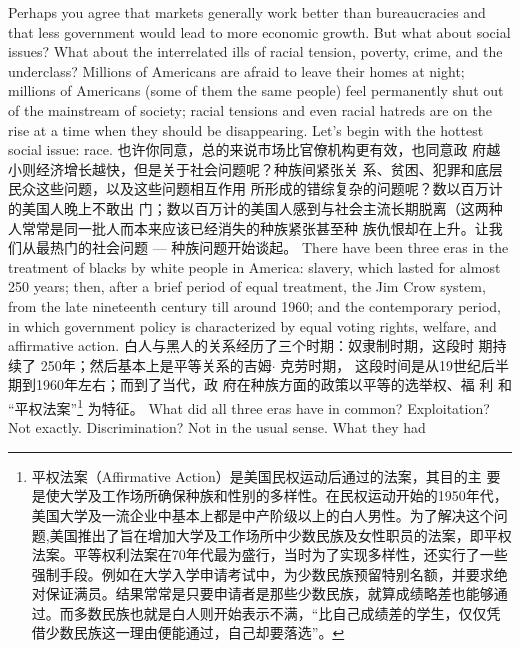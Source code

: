 \begin{paracol}{2}
Perhaps you agree that markets generally work better than bureaucracies and that less government would lead to more economic growth. But what about social issues? What about the
interrelated ills of racial tension, poverty, crime, and the underclass? Millions of Americans are afraid to leave their homes at
night; millions of Americans (some of them the same people)
feel permanently shut out of the mainstream of society; racial
tensions and even racial hatreds are on the rise at a time when
they should be disappearing. Let's begin with the hottest social
issue: race.
\switchcolumn
也许你同意，总的来说市场比官僚机构更有效，也同意政
府越小则经济增长越快，但是关于社会问题呢？种族间紧张关
系、贫困、犯罪和底层民众这些问题，以及这些问题相互作用
所形成的错综复杂的问题呢？数以百万计的美国人晚上不敢出
门；数以百万计的美国人感到与社会主流长期脱离（这两种
人常常是同一批人而本来应该已经消失的种族紧张甚至种
族仇恨却在上升。让我们从最热门的社会问题 --- 种族问题开始谈起。
\switchcolumn*
There have been three eras in the treatment of blacks by
white people in America: slavery, which lasted for almost 250
years; then, after a brief period of equal treatment, the Jim
Crow system, from the late nineteenth century till around
1960; and the contemporary period, in which government policy is characterized by equal voting rights, welfare, and affirmative action.
\switchcolumn
白人与黑人的关系经历了三个时期：奴隶制时期，这段时
期持续了 250年；然后基本上是平等关系的吉姆$\cdot$ 克劳时期，
这段时间是从19世纪后半期到1960年左右；而到了当代，政
府在种族方面的政策以平等的选举权、福 利 和 “平权法案”\footnote{平权法案（Affirmative  Action）是美国民权运动后通过的法案，其目的主	要是使大学及工作场所确保种族和性别的多样性。在民权运动开始的1950年代，美国大学及一流企业中基本上都是中产阶级以上的白人男性。为了解决这个问题,美国推出了旨在增加大学及工作场所中少数民族及女性职员的法案，即平权法案。平等权利法案在70年代最为盛行，当时为了实现多样性，还实行了一些强制手段。例如在大学入学申请考试中，为少数民族预留特别名额，并要求绝对保证满员。结果常常是只要申请者是那些少数民族，就算成绩略差也能够通过。而多数民族也就是白人则开始表示不满，“比自己成绩差的学生，仅仅凭借少数民族这一理由便能通过，自己却要落选”。}
为特征。
\switchcolumn*
What did all three eras have in common? Exploitation? Not
exactly. Discrimination? Not in the usual sense. What they had

\end{paracol}
